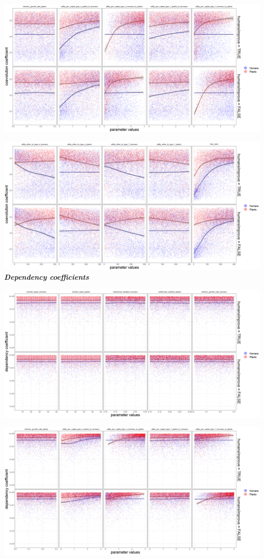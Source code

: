 \documentclass[
]{book}
\begin{document}
\includegraphics[width=1\linewidth]{plots/5_LHS_humansImprove_coevolution_coefficients_bifurcationPlot_twoVariables_per_parameter_and_scenario_part2}

\includegraphics[width=1\linewidth]{plots/5_LHS_humansImprove_coevolution_coefficients_bifurcationPlot_twoVariables_per_parameter_and_scenario_part3}
\textbf{\emph{Dependency coefficients}}

\includegraphics[width=1\linewidth]{plots/5_LHS_humansImprove_dependency_coefficients_bifurcationPlot_twoVariables_per_parameter_and_scenario_part1}

\includegraphics[width=1\linewidth]{plots/5_LHS_humansImprove_dependency_coefficients_bifurcationPlot_twoVariables_per_parameter_and_scenario_part2}
\end{document}
